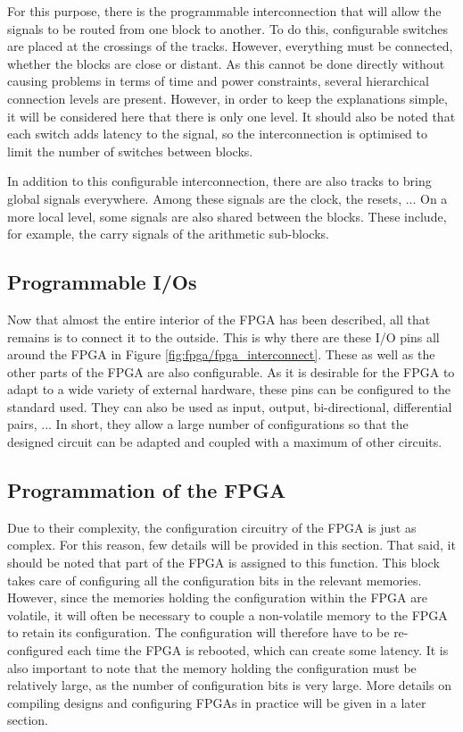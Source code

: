 For this purpose, there is the programmable interconnection that will allow the signals to be routed 
from one block to another. To do this, configurable switches are placed at the crossings of the 
tracks. However, everything must be connected, whether the blocks are close or distant. As this 
cannot be done directly without causing problems in terms of time and power constraints, several 
hierarchical connection levels are present. However, in order to keep the explanations simple, it 
will be considered here that there is only one level. It should also be noted that each switch adds 
latency to the signal, so the interconnection is optimised to limit the number of switches between 
blocks. 

In addition to this configurable interconnection, there are also tracks to bring global signals 
everywhere. Among these signals are the clock, the resets, ... On a more local level, some signals 
are also shared between the blocks. These include, for example, the carry signals of the arithmetic 
sub-blocks.

\subsection{Programmable I/Os}

Now that almost the entire interior of the FPGA has been described, all that remains is to connect 
it to the outside. This is why there are these I/O pins all around the FPGA in Figure 
\ref{fig:fpga/fpga_interconnect}. These as well as the other parts of the FPGA are also 
configurable. As it is desirable for the FPGA to adapt to a wide variety of external hardware, these 
pins can be configured to the standard used. They can also be used as input, output, bi-directional, 
differential pairs, ... In short, they allow a large number of configurations so that the designed 
circuit can be adapted and coupled with a maximum of other circuits.

\subsection{Programmation of the FPGA}

Due to their complexity, the configuration circuitry of the FPGA is just as complex. For this 
reason, few details will be provided in this section. That said, it should be noted that part of 
the FPGA is assigned to this function. This block takes care of configuring all the 
configuration bits in the relevant memories. However, since the memories holding the configuration 
within the FPGA are volatile, it will often be necessary to couple a non-volatile memory to the 
FPGA to retain its configuration. The configuration will therefore have to be re-configured each 
time the FPGA is rebooted, which can create some latency. It is also important to note that the 
memory holding the configuration must be relatively large, as the number of configuration bits is 
very large. More details on compiling designs and configuring FPGAs in practice will be given in a 
later section.

